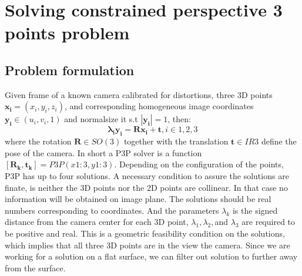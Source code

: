 \documentclass{article}
\begin{document}
\section{Solving constrained perspective 3 points problem}
\subsection*{Problem formulation}

Given frame of a known camera calibrated for distortions, three 3D points $\boldsymbol{x_i}= (x_i,y_i,z_i)$, and corresponding homogeneous image coordinates $\boldsymbol{y_i} \in (u_i,v_i,1)$ and normalsize it s.t $|\boldsymbol{y_i}|= 1$, then:
 \begin{equation}
    \boldsymbol{\lambda_i} \boldsymbol{y_i} = \boldsymbol{R}\boldsymbol{x_i} +\boldsymbol{t}, i \in {1,2,3}
 \end{equation}
 where the rotation $\boldsymbol{R} \in SO(3)$ together with the translation $\boldsymbol{t} \in IR3$ define the pose of
 the camera. In short a P3P solver is a function $[\boldsymbol{R_k,t_k}] = P3P(x1:3,y1:3)$. Depending
 on the configuration of the points, P3P has up to four solutions.
 A necessary condition to assure the solutions are finate, is neither the 3D points nor the 2D points are collinear. In that case no information will be obtained on image plane. The solutions should be real numbers corresponding to coordinates. And the parameters $\lambda_k$ is the signed distance from the camera center for each 3D point, $\lambda_1,\lambda_2, $and $\lambda_3$ are required to be positive and real. This is a geometric feasibility condition on the solutions, which implies that all three 3D points are in the view the camera. Since we are working for a solution on a flat surface, we can filter out solution to further away from the surface.
 
\end{document}
